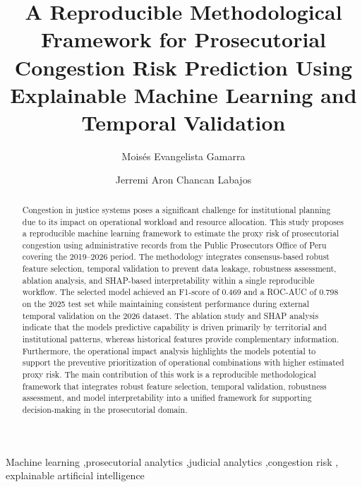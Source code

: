\documentclass[
  number]{elsarticle}
\begin{document}
\begin{frontmatter}
\title{A Reproducible Methodological Framework for Prosecutorial
Congestion Risk Prediction Using Explainable Machine Learning and
Temporal Validation}
\author[1]{Moisés Evangelista Gamarra%
%
}
\author[1]{Jerremi Aron Chancan Labajos%
%
}




        
\begin{abstract}
Congestion in justice systems poses a significant challenge for
institutional planning due to its impact on operational workload and
resource allocation. This study proposes a reproducible machine learning
framework to estimate the proxy risk of prosecutorial congestion using
administrative records from the Public Prosecutor\textquotesingle s
Office of Peru covering the 2019--2026 period. The methodology
integrates consensus-based robust feature selection, temporal validation
to prevent data leakage, robustness assessment, ablation analysis, and
SHAP-based interpretability within a single reproducible workflow. The
selected model achieved an F1-score of 0.469 and a ROC-AUC of 0.798 on
the 2025 test set while maintaining consistent performance during
external temporal validation on the 2026 dataset. The ablation study and
SHAP analysis indicate that the model\textquotesingle s predictive
capability is driven primarily by territorial and institutional
patterns, whereas historical features provide complementary information.
Furthermore, the operational impact analysis highlights the
model\textquotesingle s potential to support the preventive
prioritization of operational combinations with higher estimated proxy
risk. The main contribution of this work is a reproducible
methodological framework that integrates robust feature selection,
temporal validation, robustness assessment, and model interpretability
into a unified framework for supporting decision-making in the
prosecutorial domain.
\end{abstract}





\begin{keyword}
    Machine learning \sep prosecutorial analytics \sep judicial
analytics \sep congestion risk \sep 
    explainable artificial intelligence
\end{keyword}
\end{frontmatter}
    
\end{document}
